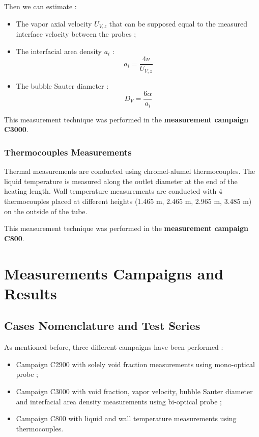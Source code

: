 Then we can estimate : 

\begin{itemize}
\item The vapor axial velocity $U_{V,z}$ that can be supposed equal to the measured interface velocity between the probes ;
\item The interfacial area density $a_{i}$ :
\begin{equation}
a_{i} = \frac{4 \nu }{U_{V,z}}
\end{equation}
\item The bubble Sauter diameter :
\begin{equation}
D_{V} = \frac{6 \alpha }{a_{i}}
\end{equation}
\end{itemize}


\begin{remark*}{}
This measurement technique was performed in the \textbf{measurement campaign C3000}.
\end{remark*}


\subsubsection{Thermocouples Measurements}

Thermal measurements are conducted using chromel-alumel thermocouples. The liquid temperature is measured along the outlet diameter at the end of the heating length. Wall temperature measurements are conducted with 4 thermocouples placed at different heights (1.465 m, 2.465 m, 2.965 m, 3.485 m) on the outside of the tube.

\begin{remark*}{}
This measurement technique was performed in the \textbf{measurement campaign C800}.
\end{remark*}



\section{Measurements Campaigns and Results}

\subsection{Cases Nomenclature and Test Series}

As mentioned before, three different campaigns have been performed :

\begin{itemize}
\item Campaign C2900 with solely void fraction measurements using mono-optical probe ;

\item Campaign C3000 with void fraction, vapor velocity, bubble Sauter diameter and interfacial area density measurements using bi-optical probe ;

\item Campaign C800 with liquid and wall temperature measurements using thermocouples.
\end{itemize}


